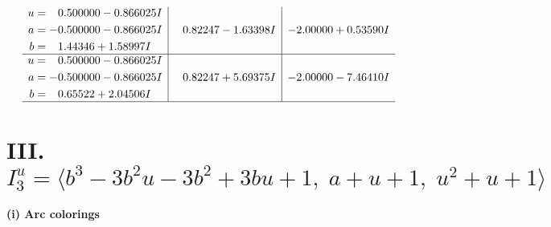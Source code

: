 \documentclass[1p]{elsarticle_modified}
\theoremstyle{definition}
\begin{document}
$$\begin{array}{c|c|c}
\begin{aligned}
u &= \phantom{-}0.500000 - 0.866025 I \\
a &= -0.500000 - 0.866025 I \\
b &= \phantom{-}1.44346 + 1.58997 I\end{aligned}
 & \phantom{-}0.82247 - 1.63398 I & -2.00000 + 0.53590 I \\ \hline\begin{aligned}
u &= \phantom{-}0.500000 - 0.866025 I \\
a &= -0.500000 - 0.866025 I \\
b &= \phantom{-}0.65522 + 2.04506 I\end{aligned}
 & \phantom{-}0.82247 + 5.69375 I & -2.00000 - 7.46410 I\\
 \hline 
 \end{array}$$\newpage\newpage\renewcommand{\arraystretch}{1}
\centering \section*{III. $I^u_{3}= \langle b^3-3 b^2 u-3 b^2+3 b u+1,\;a+u+1,\;u^2+u+1 \rangle$}
\flushleft \textbf{(i) Arc colorings}\\
\end{document}
